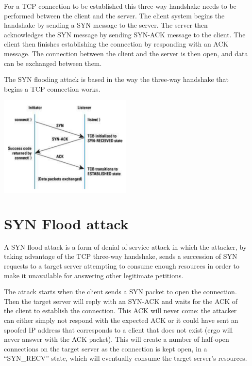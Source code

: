 \documentclass[11pt]{article}
\begin{document}
For a TCP connection to be established this three-way handshake needs to be performed between the client and the server. The client system begins the handshake by sending a SYN message to the server. The server then acknowledges the SYN message by sending SYN-ACK message to the client. The client then finishes establishing the connection by responding with an ACK message. The connection between the client and the server is then open, and data can be exchanged between them.\vspace{5mm}

The SYN flooding attack is based in the way the three-way handshake that begins a TCP connection works.

\begin{center}
\vfill\vfill
\includegraphics[width=0.5\textwidth]{3wayhandshake.png}\\[1cm]
\end{center}

\section{SYN Flood attack}
A SYN flood attack is a form of denial of service attack in which the attacker, by taking advantage of the TCP three-way handshake, sends a succession of SYN requests to a target server attempting to consume enough resources in order to make it unavailable for answering other legitimate petitions.\vspace{5mm}

The attack starts when the client sends a SYN packet to open the connection. Then the target server will reply with an SYN-ACK and waits for the ACK of the client to establish the connection. This ACK will never come: the attacker can either simply not respond with the expected ACK or it could have sent an spoofed IP address that corresponds to a client that does not exist (ergo will never answer with the ACK packet). This will create a number of half-open connections on the target server as the connection is kept open, in a “SYN\_RECV” state, which will eventually consume the target server's resources.\vspace{5mm}
\end{document}
